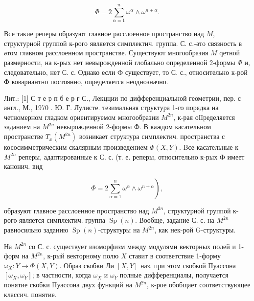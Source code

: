 \documentclass[10pt]{article}
\begin{document}
\[

\Phi=2 \sum_{\alpha=1}^{n} \omega^{\alpha} \wedge \omega^{n+\alpha} .

\]



Все такие реперы образуют главное расслоенное пространство над $M$, структурной группой к-рого является симплектич. группа. С. с.-әто связность в әтом главном расслоенном пространстве. Существуют многообразия $M$ qетной размерности, на к-рых нет невырожденной глобально определенной 2-формы $\Phi$ и, следовательно, нет С. с. Однако если Ф существует, то С. с., относительно к-рой Ф ковариантно постоянно, определяется неоднозначно.



Лит.: [1] С т е р п б е р г С., Лекцции по дифференциальной геометрии, пер. с англ., М., 1970 . Ю. Г. Лулисте. тезимальная структура 1-го порядка на четномерном гладком ориентируемом многообразии $M^{2 n}$, к-рая оІІределяется заданием на $M^{2 n}$ невырожденной 2-формы $Ф$. В каждом касательном пространстве $T_{x}\left(M^{2 n}\right)$ возникает структура симплектич. пространства с кососимметрическим скалярным произведением $\Phi(X, Y)$. Bсе касательные к $M^{2 n}$ реперы, адаптированные к С. с. (т. е. реперы, относительно к-рых Ф имеет канонич. вид



\[

\left.\Phi=2 \sum_{\alpha=1}^{n} \omega^{\alpha} \wedge \omega^{n+\alpha}\right),

\]



образуют главное расслоенное пространство над $M^{2 n}$, структурной группой к-рого является симплектич. группа $\operatorname{Sp}(n)$. Вообще, задание С. с. на $M^{2 n}$ равносильно заданию $\operatorname{Sp}(n)$-структуры на $M^{2 n}$, как нек-рой G-структуры.



На $M^{2 n}$ со С. с. существует изоморфизм между модулями векторных полей и 1-форм на $M^{2 n}$, к-рый векторному полю $X$ ставит в соответствие 1-форму $\omega_{X}: Y \rightarrow \Phi(X, Y)$. Образ скобки Ли $[X, Y]$ наз. при этом скобкой Пуассона $\left[\omega_{X}, \omega_{Y}\right]$; в частности, когда $\omega_{X}$ и $\omega_{Y}$ полные дифференциалы, получается понятие скобки Пуассона двух функций на $M^{2 n}$, к-рое обобщает соответствующее классич. понятие.
\end{document}

